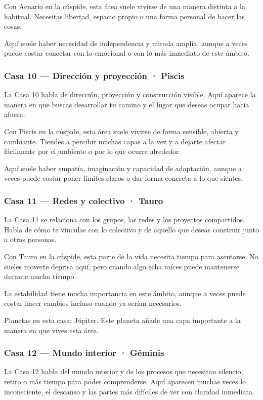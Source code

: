 \documentclass[11pt,a4paper]{article}
\begin{document}
Con Acuario en la cúspide, esta área suele vivirse de una manera distinta a la habitual. Necesitas libertad, espacio propio o una forma personal de hacer las cosas.

Aquí suele haber necesidad de independencia y mirada amplia, aunque a veces puede costar conectar con lo emocional o con lo más inmediato de este ámbito.

\subsubsection*{Casa 10 — Dirección y proyección · Piscis}
La Casa 10 habla de dirección, proyección y construcción visible. Aquí aparece la manera en que buscas desarrollar tu camino y el lugar que deseas ocupar hacia afuera.

Con Piscis en la cúspide, esta área suele vivirse de forma sensible, abierta y cambiante. Tiendes a percibir muchas capas a la vez y a dejarte afectar fácilmente por el ambiente o por lo que ocurre alrededor.

Aquí suele haber empatía, imaginación y capacidad de adaptación, aunque a veces puede costar poner límites claros o dar forma concreta a lo que sientes.

\subsubsection*{Casa 11 — Redes y colectivo · Tauro}
La Casa 11 se relaciona con los grupos, las redes y los proyectos compartidos. Habla de cómo te vinculas con lo colectivo y de aquello que deseas construir junto a otras personas.

Con Tauro en la cúspide, esta parte de la vida necesita tiempo para asentarse. No sueles moverte deprisa aquí, pero cuando algo echa raíces puede mantenerse durante mucho tiempo.

La estabilidad tiene mucha importancia en este ámbito, aunque a veces puede costar hacer cambios incluso cuando ya serían necesarios.

Planetas en esta casa: Júpiter. Este planeta añade una capa importante a la manera en que vives esta área.

\subsubsection*{Casa 12 — Mundo interior · Géminis}
La Casa 12 habla del mundo interior y de los procesos que necesitan silencio, retiro o más tiempo para poder comprenderse. Aquí aparecen muchas veces lo inconsciente, el descanso y las partes más difíciles de ver con claridad inmediata.
\end{document}
